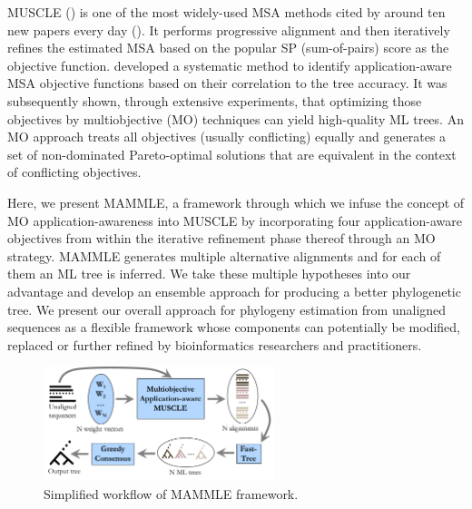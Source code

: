MUSCLE (\cite{edgar2004muscle}) is one of the most widely-used MSA methods cited by around ten new papers every day (\cite{muscle-web}). It performs progressive alignment and then iteratively refines the estimated MSA based on the popular SP (sum-of-pairs) score as the objective function. \cite{nayeem2020multiobjective} developed a systematic method to identify application-aware MSA objective functions based on their correlation to the tree accuracy. It was subsequently shown, through extensive experiments, that optimizing those objectives by multiobjective (MO) techniques can yield high-quality ML trees. An MO approach treats all objectives (usually conflicting) equally and generates a set of non-dominated Pareto-optimal solutions that are equivalent in the context of conflicting objectives. 

Here, we present MAMMLE, a framework through which we infuse the concept of MO application-awareness into MUSCLE by incorporating four application-aware objectives from \cite{nayeem2020multiobjective} within the iterative refinement phase thereof through an MO strategy. MAMMLE generates multiple alternative alignments and for each of them an ML tree is inferred. We take these multiple hypotheses into our advantage and develop an ensemble approach for producing a better phylogenetic tree. We present our overall approach for phylogeny estimation from unaligned sequences as a flexible framework whose components can potentially be modified, replaced or further refined by bioinformatics researchers and practitioners.

\begin{figure}[!htbp]
	\centering
	\includegraphics[width=0.6\textwidth]{Figure/workflow.pdf}
	\caption{Simplified workflow of MAMMLE framework.}
	\label{fig:workflow}
\end{figure}
\vspace{-12 mm}

